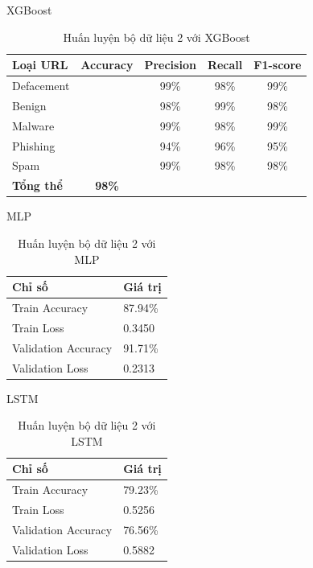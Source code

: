 \documentclass[13pt]{article}
\begin{document}
XGBoost
\begin{table}[h]
    \centering
    \renewcommand{\arraystretch}{1.3} %
    \begin{tabular}{|l|c|c|c|c|}
        \hline
        \rowcolor[HTML]{C0C0C0} %
        \textbf{Loại URL} & \textbf{Accuracy} & \textbf{Precision} & \textbf{Recall} & \textbf{F1-score} \\ 
        \hline
        Defacement &  & 99\% & 98\% & 99\% \\ 
        \hline
        Benign &  & 98\% & 99\% & 98\% \\ 
        \hline
        Malware &  & 99\% & 98\% & 99\% \\ 
        \hline
        Phishing &  & 94\% & 96\% & 95\% \\ 
        \hline
        Spam &  & 99\% & 98\% & 98\% \\ 
        \hline
        \textbf{Tổng thể} & \textbf{98\%} &  &  &  \\ 
        \hline
    \end{tabular}
    \caption{Huấn luyện bộ dữ liệu 2 với XGBoost}
    \label{tab:logistic_regression}
\end{table}

\newpage
MLP
\begin{table}[h]
    \centering
    \renewcommand{\arraystretch}{1.4} %
    \begin{tabular}{|p{5cm}|p{3cm}|}
        \hline
        \rowcolor[HTML]{C0C0C0} %
        \textbf{Chỉ số} & \textbf{Giá trị} \\ 
        \hline
        Train Accuracy & 87.94\% \\ 
        \hline
        Train Loss & 0.3450 \\ 
        \hline
        Validation Accuracy & 91.71\% \\ 
        \hline
        Validation Loss & 0.2313 \\ 
        \hline
    \end{tabular}
    \caption{Huấn luyện bộ dữ liệu 2 với MLP}
    \label{tab:mlp_training}
\end{table}

LSTM
\begin{table}[h]
    \centering
    \renewcommand{\arraystretch}{1.4} %
    \begin{tabular}{|p{5cm}|p{3cm}|}
        \hline
        \rowcolor[HTML]{C0C0C0} %
        \textbf{Chỉ số} & \textbf{Giá trị} \\ 
        \hline
        Train Accuracy & 79.23\% \\ 
        \hline
        Train Loss & 0.5256 \\ 
        \hline
        Validation Accuracy & 76.56\% \\ 
        \hline
        Validation Loss & 0.5882 \\ 
        \hline
    \end{tabular}
    \caption{Huấn luyện bộ dữ liệu 2 với LSTM}
    \label{tab:mlp_training}
\end{table}
\end{document}
